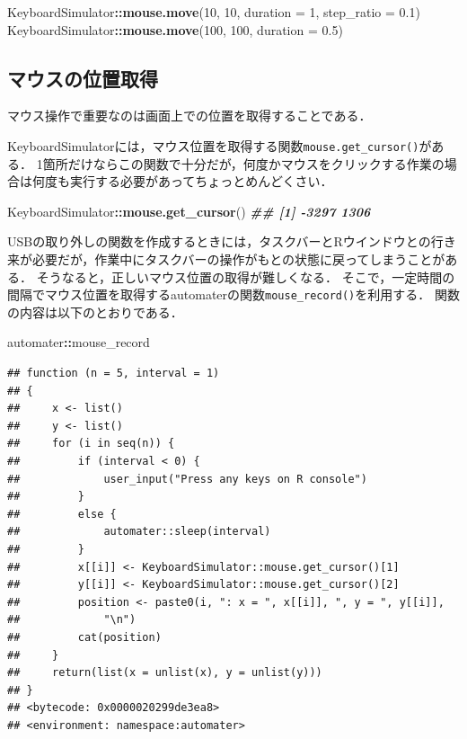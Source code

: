 \documentclass[
]{article}
\newenvironment{Shaded}{\begin{snugshade}}{\end{snugshade}}
\newcommand{\AttributeTok}[1]{\textcolor[rgb]{0.13,0.29,0.53}{#1}}
\newcommand{\DecValTok}[1]{\textcolor[rgb]{0.00,0.00,0.81}{#1}}
\newcommand{\DocumentationTok}[1]{\textcolor[rgb]{0.56,0.35,0.01}{\textbf{\textit{#1}}}}
\newcommand{\FloatTok}[1]{\textcolor[rgb]{0.00,0.00,0.81}{#1}}
\newcommand{\FunctionTok}[1]{\textcolor[rgb]{0.13,0.29,0.53}{\textbf{#1}}}
\newcommand{\NormalTok}[1]{#1}
\newcommand{\SpecialCharTok}[1]{\textcolor[rgb]{0.81,0.36,0.00}{\textbf{#1}}}
\begin{document}
\begin{Shaded}
\begin{Highlighting}[]
\NormalTok{KeyboardSimulator}\SpecialCharTok{::}\FunctionTok{mouse.move}\NormalTok{(}\DecValTok{10}\NormalTok{, }\DecValTok{10}\NormalTok{, }\AttributeTok{duration =} \DecValTok{1}\NormalTok{, }\AttributeTok{step\_ratio =} \FloatTok{0.1}\NormalTok{)}
\NormalTok{KeyboardSimulator}\SpecialCharTok{::}\FunctionTok{mouse.move}\NormalTok{(}\DecValTok{100}\NormalTok{, }\DecValTok{100}\NormalTok{, }\AttributeTok{duration =} \FloatTok{0.5}\NormalTok{)}
\end{Highlighting}
\end{Shaded}

\hypertarget{ux30deux30a6ux30b9ux306eux4f4dux7f6eux53d6ux5f97}{%
\subsection{マウスの位置取得}\label{ux30deux30a6ux30b9ux306eux4f4dux7f6eux53d6ux5f97}}

マウス操作で重要なのは画面上での位置を取得することである．

KeyboardSimulatorには，マウス位置を取得する関数\texttt{mouse.get\_cursor()}がある．
1箇所だけならこの関数で十分だが，何度かマウスをクリックする作業の場合は何度も実行する必要があってちょっとめんどくさい．

\begin{Shaded}
\begin{Highlighting}[]
\NormalTok{KeyboardSimulator}\SpecialCharTok{::}\FunctionTok{mouse.get\_cursor}\NormalTok{()}
 \DocumentationTok{\#\# [1] {-}3297  1306}
\end{Highlighting}
\end{Shaded}

USBの取り外しの関数を作成するときには，タスクバーとRウインドウとの行き来が必要だが，作業中にタスクバーの操作がもとの状態に戻ってしまうことがある．
そうなると，正しいマウス位置の取得が難しくなる．
そこで，一定時間の間隔でマウス位置を取得するautomaterの関数\texttt{mouse\_record()}を利用する．
関数の内容は以下のとおりである．

\begin{Shaded}
\begin{Highlighting}[]
\NormalTok{automater}\SpecialCharTok{::}\NormalTok{mouse\_record}
\end{Highlighting}
\end{Shaded}

\begin{verbatim}
## function (n = 5, interval = 1) 
## {
##     x <- list()
##     y <- list()
##     for (i in seq(n)) {
##         if (interval < 0) {
##             user_input("Press any keys on R console")
##         }
##         else {
##             automater::sleep(interval)
##         }
##         x[[i]] <- KeyboardSimulator::mouse.get_cursor()[1]
##         y[[i]] <- KeyboardSimulator::mouse.get_cursor()[2]
##         position <- paste0(i, ": x = ", x[[i]], ", y = ", y[[i]], 
##             "\n")
##         cat(position)
##     }
##     return(list(x = unlist(x), y = unlist(y)))
## }
## <bytecode: 0x0000020299de3ea8>
## <environment: namespace:automater>
\end{verbatim}
\end{document}
